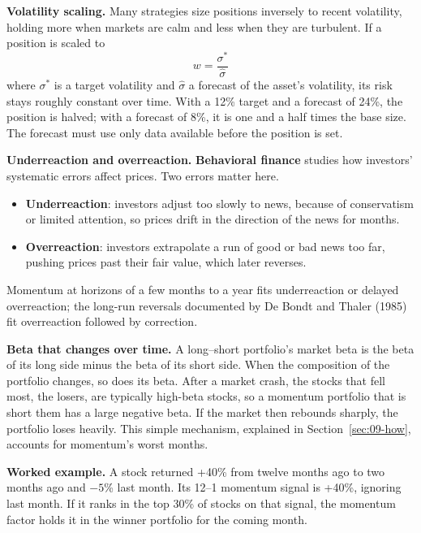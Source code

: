 \textbf{Volatility scaling.} Many strategies size positions inversely to recent volatility, holding more when markets are calm and less when they are turbulent. If a position is scaled to
\begin{equation}
  w = \frac{\sigma^*}{\hat\sigma}
  \label{eq:09-volscale}
\end{equation}
where $\sigma^*$ is a target volatility and $\hat\sigma$ a forecast of the asset's volatility, its risk stays roughly constant over time. With a 12\% target and a forecast of 24\%, the position is halved; with a forecast of 8\%, it is one and a half times the base size. The forecast must use only data available before the position is set.

\textbf{Underreaction and overreaction.} \textbf{Behavioral finance} studies how investors' systematic errors affect prices. Two errors matter here.

\begin{itemize}
  \item \textbf{Underreaction}: investors adjust too slowly to news, because of conservatism or limited attention, so prices drift in the direction of the news for months.
  \item \textbf{Overreaction}: investors extrapolate a run of good or bad news too far, pushing prices past their fair value, which later reverses.
\end{itemize}

Momentum at horizons of a few months to a year fits underreaction or delayed overreaction; the long-run reversals documented by De Bondt and Thaler (1985) fit overreaction followed by correction.

\textbf{Beta that changes over time.} A long--short portfolio's market beta is the beta of its long side minus the beta of its short side. When the composition of the portfolio changes, so does its beta. After a market crash, the stocks that fell most, the losers, are typically high-beta stocks, so a momentum portfolio that is short them has a large negative beta. If the market then rebounds sharply, the portfolio loses heavily. This simple mechanism, explained in Section~\ref{sec:09-how}, accounts for momentum's worst months.

\textbf{Worked example.} A stock returned +40\% from twelve months ago to two months ago and $-5$\% last month. Its 12--1 momentum signal is +40\%, ignoring last month. If it ranks in the top 30\% of stocks on that signal, the momentum factor holds it in the winner portfolio for the coming month.

